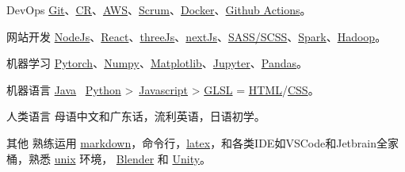
\begin{cvskills}

  \cvskill
    {DevOps} %
    {\href{https://git-scm.com/}{Git}、\href{https://en.wikipedia.org/wiki/Code_review}{CR}、\href{https://aws.amazon.com/}{AWS}、\href{https://www.scrum.org/resources/what-is-scrum}{Scrum}、\href{https://www.docker.com/}{Docker}、\href{https://github.com/features/actions}{Github Actions}。}

  \cvskill
    {网站开发} %
    {\href{https://nodejs.org/en/}{NodeJs}、\href{https://reactjs.org/}{React}、\href{https://threejs.org/}{threeJs}、\href{https://nextjs.org/}{nextJs}、\href{https://sass-lang.com/}{SASS/SCSS}、\href{https://spark.apache.org/}{Spark}、\href{https://hadoop.apache.org/}{Hadoop}。}

  \cvskill
    {机器学习} %
    {\href{https://pytorch.org/}{Pytorch}、\href{https://numpy.org/}{Numpy}、\href{https://matplotlib.org/}{Matplotlib}、\href{https://jupyter.org/}{Jupyter}、\href{https://pandas.pydata.org/}{Pandas}。}  %

  \cvskill
    {机器语言}
    {\href{https://www.java.com/en/}{Java} \approx\, \href{https://www.python.org/}{Python} >\, \href{https://www.javascript.com/}{Javascript} > \href{https://www.khronos.org/opengl/wiki/OpenGL_Shading_Language}{GLSL} = \href{https://developer.mozilla.org/en-US/docs/Glossary/HTML5}{HTML}/\href{https://developer.mozilla.org/en-US/docs/Web/CSS}{CSS}。}

  \cvskill
    {人类语言}
    {母语中文和广东话，流利英语，日语初学。}

  \cvskill
    {其他} %
    {熟练运用 \href{https://en.wikipedia.org/wiki/Markdown}{markdown}，命令行，\href{https://www.latex-project.org/}{latex}，和各类IDE如VSCode和Jetbrain全家桶，熟悉 \href{https://en.wikipedia.org/wiki/Unix}{unix} 环境， \href{https://www.blender.org/}{Blender} 和 \href{https://unity.com/}{Unity}。}

\end{cvskills}
